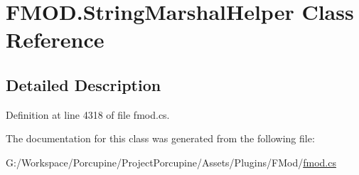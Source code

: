 \hypertarget{class_f_m_o_d_1_1_string_marshal_helper}{}\section{F\+M\+O\+D.\+String\+Marshal\+Helper Class Reference}
\label{class_f_m_o_d_1_1_string_marshal_helper}


\subsection{Detailed Description}


Definition at line 4318 of file fmod.\+cs.



The documentation for this class was generated from the following file\+:\begin{DoxyCompactItemize}
\item 
G\+:/\+Workspace/\+Porcupine/\+Project\+Porcupine/\+Assets/\+Plugins/\+F\+Mod/\hyperlink{fmod_8cs}{fmod.\+cs}\end{DoxyCompactItemize}
